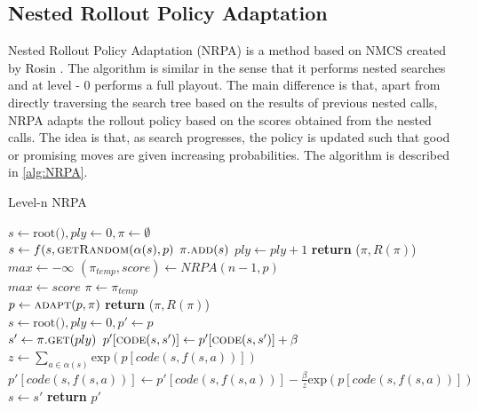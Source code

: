 \documentclass[master.tex]{subfiles}
\begin{document}
\subsection{Nested Rollout Policy Adaptation} 
Nested Rollout Policy Adaptation (NRPA) is a method based on NMCS created by Rosin . The algorithm is similar in the sense that it performs nested searches and at level - 0 performs a full playout. The main difference is that, apart from directly traversing the search tree based on the results of previous nested calls, NRPA adapts the rollout policy based on the scores obtained from the nested calls. The idea is that, as search progresses, the policy is updated such that good or promising moves are given increasing probabilities. The algorithm is described in \ref{alg:NRPA}. 

\begin{algorithm}
\caption{Level-n NRPA}
\label{alg:NRPA}
\begin{algorithmic}[1] 
	\State $s \gets \text{root()}, ply \gets 0, \pi \gets \emptyset$
	\\
		 \State $s \gets f(s, \textsc{getRandom}(\alpha (s), p)$
		 \State $\pi.\textsc{add}(s)$
		 \State $ply \gets ply + 1$
	\EndWhile
	\State \textbf{return} ($\pi, R(\pi)$)
\Else
	\State $max \gets -\infty$
		\State $(\pi_{temp}, score) \gets NRPA(n - 1, p)$
		\\
			\State $max \gets score$
			\State $\pi \gets \pi_{temp}$
		\EndIf
		\\ 
		\State $p \gets \textsc{adapt}(p, \pi)$
	\EndFor
	\State  \textbf{return} ($\pi, R(\pi)$)
\EndIf
\\
\EndProcedure
{}
\State $s \gets  \text{root()}, ply \gets 0, p' \gets p$
\\
	\State $s' \gets \pi.\textsc{get}(ply)$
	\State $p'[\textsc{code}(s, s')] \gets p'[\textsc{code}(s, s')]  + \beta$
	\\
	\State $z \gets \sum_{a \in \alpha(s)} \text{exp}(p[code(s, f(s, a))])$
	\\
		\State $p'[code(s, f(s, a))] \gets p'[code(s, f(s, a))] - \frac{\beta}{z}\text{exp}(p[code(s, f(s, a))])$
	\EndFor
	\\
	\State $s \gets s'$
\EndWhile
\State  \textbf{return} $p'$
\EndProcedure
\end{algorithmic}
\end{algorithm}
\end{document}

